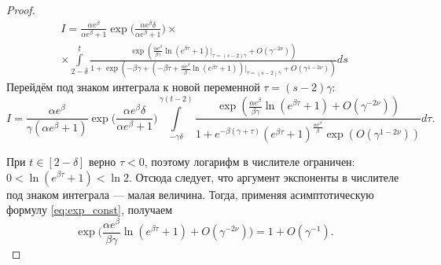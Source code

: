 \begin{proof}
\begin{comment}
\[
I = \int\limits_{\tilde{t}}^{t}\frac{\alpha\exp(x_\gamma^*(s-1)+\beta(s-\tilde{t})-x_\gamma^*(\tilde{t}))}{1+\exp(\gamma x_\gamma^*(s-1))}ds = 
\]
\[
= \int\limits_{2-\delta}^{t}\frac{\alpha\exp(-\beta+\frac1\gamma w_0|_{\tau=(t-2)\gamma}+\Delta_2+\beta(s-2+\delta)-x^*_\gamma(2-\delta))}{1+\exp(-\beta\gamma+ w_0|_{\tau=(t-2)\gamma}+\gamma\Delta_2)}ds=
\]
\[
= \int\limits_{2-\delta}^{t}\frac{\alpha\exp(-\beta+\frac1\gamma (-\beta \tau+\frac{\alpha e^\beta}{\beta}\ln(e^{\beta\tau}+1))|_{\tau=(t-2)\gamma}+\Delta_2+\frac1\gamma\beta\tau+\beta\delta-x^*_\gamma(2-\delta))}{1+\exp(-\beta\gamma+ (-\beta \tau+\frac{\alpha e^\beta}{\beta}\ln(e^{\beta\tau}+1))|_{\tau=(t-2)\gamma}+\gamma\Delta_2)}ds=
\]
\[
= \int\limits_{2-\delta}^{t}\frac{\alpha\exp(-\beta+ \frac{\alpha e^\beta}{\beta\gamma}\ln(e^{\beta\tau}+1)|_{\tau=(t-2)\gamma}+\Delta_2+\beta\delta-(-2\beta+\beta\delta+\ln(\alpha e^{\beta}+1)-\frac{\alpha e^{\beta}\delta}{\alpha e^\beta+1} +\Delta_3))}{1+\exp(-\beta\gamma+ (-\beta \tau+\frac{\alpha e^\beta}{\beta}\ln(e^{\beta\tau}+1))|_{\tau=(t-2)\gamma}+\gamma\Delta_2)}ds=
\]
\end{comment}

\begin{multline*}
I = \frac{\alpha e^\beta}{\alpha e^{\beta}+1}\exp\Big(\frac{\alpha e^{\beta}\delta}{\alpha e^\beta+1}\Big) \times
\\
\times\int\limits_{2-\delta}^{t}\frac{\exp( \frac{\alpha e^\beta}{\beta\gamma}\ln(e^{\beta\tau}+1)|_{\tau=(s-2)\gamma} +O(\gamma^{-2\nu}))}{1+\exp(-\beta\gamma+ (-\beta \tau+\frac{\alpha e^\beta}{\beta}\ln(e^{\beta\tau}+1))|_{\tau=(s-2)\gamma}+O(\gamma^{1 - 2\nu}))}ds
\end{multline*}
%
Перейдём под знаком интеграла к новой переменной $\tau=(s-2)\gamma$:
\small
\begin{equation}
	\label{eq:I_step4}
	I = \frac{\alpha e^\beta}{\gamma(\alpha e^{\beta}+1)}\exp\Big(\frac{\alpha e^{\beta}\delta}{\alpha e^\beta+1}\Big)
	\int\limits_{-\gamma \delta}^{\gamma (t - 2)}\frac{\exp( \frac{\alpha e^\beta}{\beta\gamma}\ln(e^{\beta\tau} + 1) +O(\gamma^{-2\nu}))}{1 + e^{-\beta(\gamma+\tau)}(e^{\beta\tau} + 1)^\frac{\alpha e^\beta}{\beta}\exp(O(\gamma^{1-2\nu}))} d\tau.
\end{equation}
\normalsize

При $t \in [2 - \delta]$ верно $\tau < 0$, поэтому логарифм в числителе ограничен: $0 < \ln(e^{\beta\tau} + 1) < \ln 2$. Отсюда следует, что аргумент экспоненты в числителе под знаком интеграла --- малая величина. Тогда, применяя асимптотическую формулу \eqref{eq:exp_const}, получаем
\begin{equation}
	\label{eq:exp_numerat}
	\exp\Big( \frac{\alpha e^\beta}{\beta \gamma}\ln(e^{\beta\tau}+1) +O(\gamma^{-2\nu})\Big) = 1 + O(\gamma^{-1}).
\end{equation}


\end{proof}
